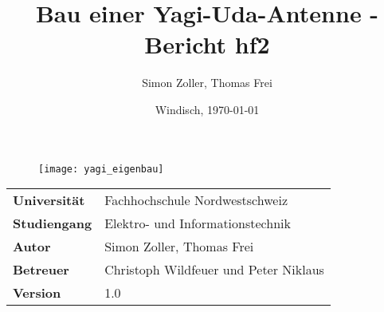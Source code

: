 \documentclass[final]{fhnwreport}       %
\title{Bau einer Yagi-Uda-Antenne - Bericht hf2}          %
\author{Simon Zoller, Thomas Frei}          %
\date{Windisch, \today}             %
\begin{document}
\maketitle

\vspace*{-1cm}						    %
\vfill
\begin{figure}[H]
\centering
\texttt{[image: yagi\_eigenbau]}
\end{figure}
\vfill

{
\renewcommand\arraystretch{2}
\begin{center}
\begin{tabular}{>{\bf}p{4cm} l}
Universität                &    Fachhochschule Nordwestschweiz\\
Studiengang                &    Elektro- und Informationstechnik\\
Autor   		           & 	Simon Zoller, Thomas Frei\\
Betreuer                   &    Christoph Wildfeuer und Peter Niklaus\\
Version                    &    1.0 %
\end{tabular}
\end{center}
}

\clearpage
			
\thispagestyle{empty}


\tableofcontents
\clearpage










{\sloppypar
\printbibliography[heading=bibintoc]
\label{sec:lit}
}

%

{%
}
\end{document}
